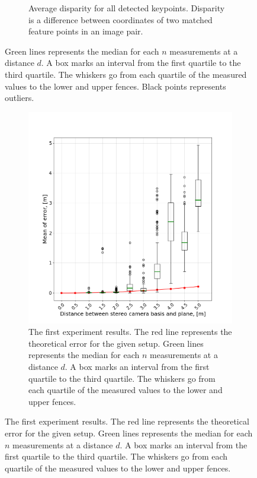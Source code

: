 \begin{figure}[ht]
\begin{subfigure}[t]{0.48\textwidth}
        \caption[Average disparity.]{Average disparity for all detected keypoints. 
        Disparity is a difference between coordinates of two matched feature points in an image pair.}
        \label{fig:exp_1_disparity}
    \end{subfigure}
  \label{fig:exp_1_res}
  \caption[The reprojection error.]{
        Green lines represents the median for each $n$ measurements at a distance $d$. 
        A box marks an interval from the first quartile to the third quartile.
        The whiskers go from each quartile of the measured values to the lower and upper fences.
        Black points represents outliers.
  }
\end{figure}

\begin{figure}[ht]
  \begin{subfigure}[ht]{0.49\textwidth}
    \centering
    \includegraphics[width=\textwidth]{graphics/experiment_1_general.png}
    \caption[The first experiment results.]{The first experiment results. The red line represents the theoretical error for the given setup. 
        Green lines represents the median for each $n$ measurements at a distance $d$. 
        A box marks an interval from the first quartile to the third quartile.
        The whiskers go from each quartile of the measured values to the lower and upper fences.
}
\end{subfigure}
\end{figure}
